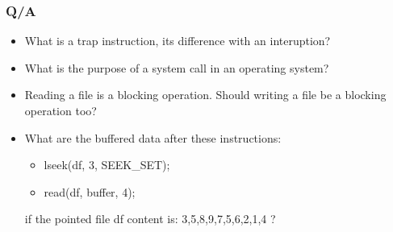 \begin{frame}
  \frametitle{Q/A}
  \begin{itemize}
    \item What is a trap instruction, its difference with an interuption? %
    \item What is the purpose of a system call in an operating system? %
    \item Reading a file is a blocking operation. Should writing a file be a blocking operation too? %
    \item What are the buffered data after these instructions:
    \begin{itemize}
        \item lseek(df, 3, SEEK\_SET);
        \item read(df, buffer, 4);
   \end{itemize}
   if the pointed file df content is: 3,5,8,9,7,5,6,2,1,4 ?
  \end{itemize}
\end{frame}
